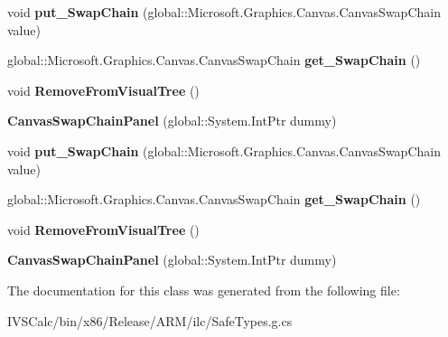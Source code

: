\begin{DoxyCompactItemize}
void {\bfseries put\+\_\+\+Swap\+Chain} (global\+::\+Microsoft.\+Graphics.\+Canvas.\+Canvas\+Swap\+Chain value)
\item 
\mbox{\label{class_microsoft_1_1_graphics_1_1_canvas_1_1_u_i_1_1_xaml_1_1_canvas_swap_chain_panel_af61cda4ef0e97561558f45eccf72337f}} 
global\+::\+Microsoft.\+Graphics.\+Canvas.\+Canvas\+Swap\+Chain {\bfseries get\+\_\+\+Swap\+Chain} ()
\item 
\mbox{\label{class_microsoft_1_1_graphics_1_1_canvas_1_1_u_i_1_1_xaml_1_1_canvas_swap_chain_panel_acc5592500685d1434cac5b6ea81af98b}} 
void {\bfseries Remove\+From\+Visual\+Tree} ()
\item 
\mbox{\label{class_microsoft_1_1_graphics_1_1_canvas_1_1_u_i_1_1_xaml_1_1_canvas_swap_chain_panel_ac356fa1d93e6b758dff25d10d7557ee2}} 
{\bfseries Canvas\+Swap\+Chain\+Panel} (global\+::\+System.\+Int\+Ptr dummy)
\item 
\mbox{\label{class_microsoft_1_1_graphics_1_1_canvas_1_1_u_i_1_1_xaml_1_1_canvas_swap_chain_panel_a96df5155a2d1f5895ca04f204345c0db}} 
void {\bfseries put\+\_\+\+Swap\+Chain} (global\+::\+Microsoft.\+Graphics.\+Canvas.\+Canvas\+Swap\+Chain value)
\item 
\mbox{\label{class_microsoft_1_1_graphics_1_1_canvas_1_1_u_i_1_1_xaml_1_1_canvas_swap_chain_panel_af61cda4ef0e97561558f45eccf72337f}} 
global\+::\+Microsoft.\+Graphics.\+Canvas.\+Canvas\+Swap\+Chain {\bfseries get\+\_\+\+Swap\+Chain} ()
\item 
\mbox{\label{class_microsoft_1_1_graphics_1_1_canvas_1_1_u_i_1_1_xaml_1_1_canvas_swap_chain_panel_acc5592500685d1434cac5b6ea81af98b}} 
void {\bfseries Remove\+From\+Visual\+Tree} ()
\item 
\mbox{\label{class_microsoft_1_1_graphics_1_1_canvas_1_1_u_i_1_1_xaml_1_1_canvas_swap_chain_panel_ac356fa1d93e6b758dff25d10d7557ee2}} 
{\bfseries Canvas\+Swap\+Chain\+Panel} (global\+::\+System.\+Int\+Ptr dummy)
\end{DoxyCompactItemize}


The documentation for this class was generated from the following file\+:\begin{DoxyCompactItemize}
\item 
I\+V\+S\+Calc/bin/x86/\+Release/\+A\+R\+M/ilc/Safe\+Types.\+g.\+cs\end{DoxyCompactItemize}
